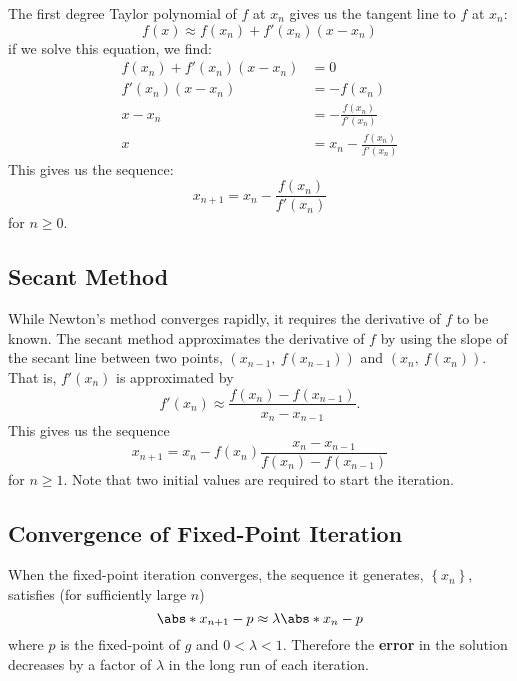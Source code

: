 \documentclass{article}
\begin{document}
The first degree Taylor polynomial of \(f\) at \(x_n\) gives us the tangent line to \(f\) at \(x_n\):
\begin{equation*}
    f\left( x \right) \approx f\left( x_n \right) + f'\left( x_n \right) \left( x - x_n \right)
\end{equation*}
if we solve this equation, we find:
\begin{align*}
    f\left( x_n \right) + f'\left( x_n \right) \left( x - x_n \right) & = 0                                                      \\
    f'\left( x_n \right) \left( x - x_n \right)                       & = -f\left( x_n \right)                                   \\
    x - x_n                                                           & = -\frac{f\left( x_n \right)}{f'\left( x_n \right)}      \\
    x                                                                 & = x_n - \frac{f\left( x_n \right)}{f'\left( x_n \right)}
\end{align*}
This gives us the sequence:
\begin{equation*}
    x_{n + 1} = x_n - \frac{f\left( x_n \right)}{f'\left( x_n \right)}
\end{equation*}
for \(n \geq 0\).
\subsection{Secant Method}
While Newton's method converges rapidly, it requires the derivative of \(f\) to be known. The secant
method approximates the derivative of \(f\) by using the slope of the secant line between two points,
\(\left( x_{n - 1},\: f\left( x_{n - 1} \right)\right)\) and \(\left( x_n,\: f\left( x_n \right) \right)\).
That is, \(f'\left( x_n \right)\) is approximated by
\begin{equation*}
    f'\left( x_n \right) \approx \frac{f\left( x_n \right) - f\left( x_{n - 1} \right)}{x_n - x_{n - 1}}.
\end{equation*}
This gives us the sequence
\begin{equation*}
    x_{n + 1} = x_n - f\left( x_n \right) \frac{x_n - x_{n - 1}}{f\left( x_n \right) - f\left( x_{n - 1} \right)}
\end{equation*}
for \(n \geq 1\). Note that two initial values are required to start the iteration.
\subsection{Convergence of Fixed-Point Iteration}
When the fixed-point iteration converges, the sequence it generates, \(\left\{ x_n \right\}\), satisfies (for sufficiently large \(n\))
\begin{equation*}
    \abs*{x_{n + 1} - p} \approx \lambda \abs*{x_n - p}
\end{equation*}
where \(p\) is the fixed-point of \(g\) and \(0 < \lambda < 1\). Therefore the \textbf{error} in the solution decreases
by a factor of \(\lambda\) in the long run of each iteration.
\end{document}
